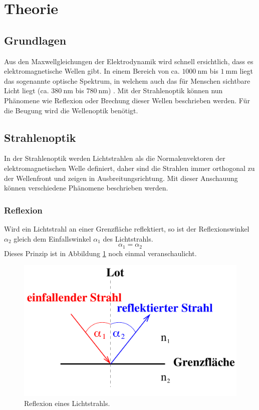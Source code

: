\section{Theorie}
\label{sec:Theorie}

\subsection{Grundlagen}
\label{sec:grundlagen}
Aus den Maxwellgleichungen der Elektrodynamik wird schnell ersichtlich, dass es elektromagnetische Wellen
gibt. In einem Bereich von ca. $\SI{1000}{\nano\metre}$ bis $\SI{1}{\milli\metre}$ liegt das sogenannte
optische Spektrum, in welchem auch das für Menschen sichtbare Licht liegt (ca. $\SI{380}{\nano\metre}$
bis $\SI{780}{\nano\metre}$) \cite{AP01}. Mit der Strahlenoptik \label{sec:strahlen} können nun Phänomene wie Reflexion oder Brechung
dieser Wellen beschrieben werden. Für die Beugung wird die Wellenoptik \label{sec:welle} benötigt.
\subsection{Strahlenoptik}
In der Strahlenoptik werden Lichtstrahlen als die Normalenvektoren der elektromagnetischen Welle
definiert, daher sind die Strahlen immer orthogonal zu der Wellenfront und zeigen in Ausbreitungsrichtung.
Mit dieser Anschauung können verschiedene Phänomene beschrieben werden.

\subsubsection*{Reflexion}
\label{sec:reflexion}
Wird ein Lichtstrahl an einer Grenzfläche reflektiert, so ist der Reflexionswinkel $\alpha_2$ gleich dem
Einfallswinkel $\alpha_1$ des Lichtstrahls.
\begin{equation}
    \alpha_1=\alpha_2
    \label{eqn:reflexion}
\end{equation}
Dieses Prinzip ist in Abbildung \ref{fig:reflexion} noch einmal veranschaulicht.
\begin{figure}[H]
    \centering
    \includegraphics[scale = 0.3]{pictures/Reflexion.png}
    \caption{Reflexion eines Lichtstrahls. \cite{AP01}}
    \label{fig:reflexion}
\end{figure}

